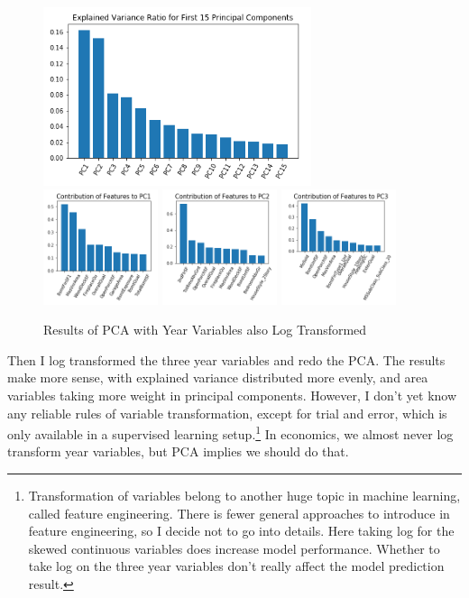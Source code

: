 \documentclass[a4paper]{article}
\begin{document}
\begin{figure}[H]
\centering
\includegraphics[width=0.7\textwidth]{pca_explained_ratio_yr.png}
\includegraphics[width=0.3\textwidth]{contribution_to_pc1_yr.png}
\includegraphics[width=0.3\textwidth]{contribution_to_pc2_yr.png}
\includegraphics[width=0.3\textwidth]{contribution_to_pc3_yr.png}
\caption{Results of PCA with Year Variables also Log Transformed}
\end{figure}

Then I log transformed the three year variables and redo the PCA. The results make more sense, with explained variance distributed more evenly, and area variables taking more weight in principal components. However, I don't yet know any reliable rules of variable transformation, except for trial and error, which is only available in a supervised learning setup.\footnote{Transformation of variables belong to another huge topic in machine learning, called feature engineering. There is fewer general approaches to introduce in feature engineering, so I decide not to go into details. Here taking log for the skewed continuous variables does increase model performance. Whether to take log on the three year variables don't really affect the model prediction result.} In economics, we almost never log transform year variables, but PCA implies we should do that.
\end{document}
